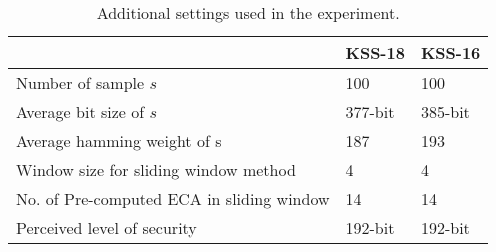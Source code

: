 \renewcommand{\arraystretch}{1.5}{
	\begin{table}[ht]
		\centering
		\caption{ Computational environment.}
		\label{table_comenv_twist_chap_ijnc2017}
	\end{table}
}

\renewcommand{\arraystretch}{1.3}{
	\begin{table}[ht]
		\begin{center}
			\caption{Additional settings used in the experiment.}
			\label{table_additional_twist_chap_ijnc2017}
			\begin{tabular}{l|l|l}
				\hline 
				& KSS-18 & KSS-16 \\ \hline
				Number of sample $s$& 100 & 100\\ \hline
				Average bit size  of $s$ & 377-bit & 385-bit\\ \hline
				Average hamming weight of s & 187 & 193\\ \hline
				Window size for sliding window method & 4 & 4\\ \hline 
				No. of Pre-computed ECA in sliding window  & 14 & 14\\ \hline 
				Perceived level of security & 192-bit & 192-bit\\ \hline
			\end{tabular}
		\end{center}
	\end{table}
}

